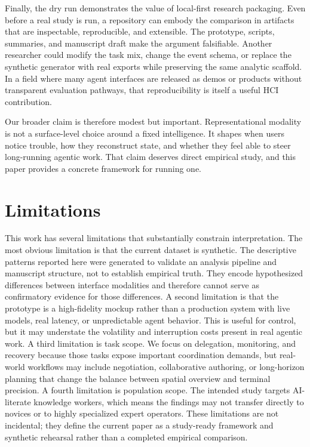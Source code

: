 \documentclass[sigconf]{acmart}
\begin{document}
Finally, the dry run demonstrates the value of local-first research packaging. Even before a real study is run, a repository can embody the comparison in artifacts that are inspectable, reproducible, and extensible. The prototype, scripts, summaries, and manuscript draft make the argument falsifiable. Another researcher could modify the task mix, change the event schema, or replace the synthetic generator with real exports while preserving the same analytic scaffold. In a field where many agent interfaces are released as demos or products without transparent evaluation pathways, that reproducibility is itself a useful HCI contribution.

Our broader claim is therefore modest but important. Representational modality is not a surface-level choice around a fixed intelligence. It shapes when users notice trouble, how they reconstruct state, and whether they feel able to steer long-running agentic work. That claim deserves direct empirical study, and this paper provides a concrete framework for running one.

\section{Limitations}
This work has several limitations that substantially constrain interpretation. The most obvious limitation is that the current dataset is synthetic. The descriptive patterns reported here were generated to validate an analysis pipeline and manuscript structure, not to establish empirical truth. They encode hypothesized differences between interface modalities and therefore cannot serve as confirmatory evidence for those differences. A second limitation is that the prototype is a high-fidelity mockup rather than a production system with live models, real latency, or unpredictable agent behavior. This is useful for control, but it may understate the volatility and interruption costs present in real agentic work. A third limitation is task scope. We focus on delegation, monitoring, and recovery because those tasks expose important coordination demands, but real-world workflows may include negotiation, collaborative authoring, or long-horizon planning that change the balance between spatial overview and terminal precision. A fourth limitation is population scope. The intended study targets AI-literate knowledge workers, which means the findings may not transfer directly to novices or to highly specialized expert operators. These limitations are not incidental; they define the current paper as a study-ready framework and synthetic rehearsal rather than a completed empirical comparison.
\end{document}
